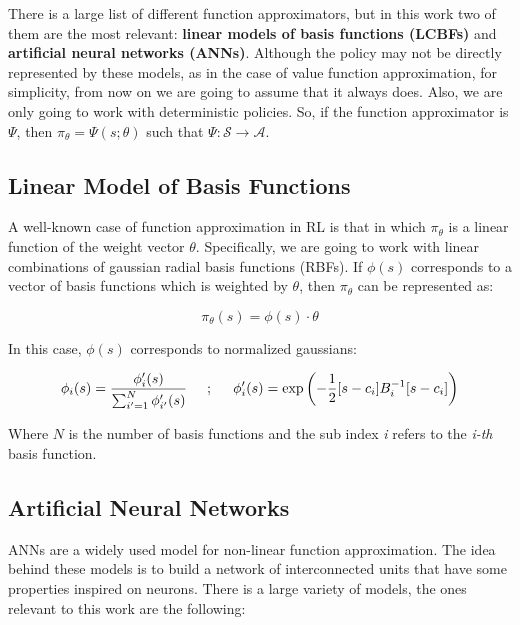 There is a large list of different function approximators, but in this work two of them are the most relevant: \textbf{linear models of basis functions (LCBFs)} and \textbf{artificial neural networks (ANNs)}. Although the policy may not be directly represented by these models, as in the case of value function approximation, for simplicity, from now on we are going to assume that it always does. Also, we are only going to work with deterministic policies. So, if the function approximator is $\Psi$, then $\pi_{\theta} = \Psi(s;\theta)$ such that $\Psi: \mathcal{S} \to \mathcal{A}$.

\newpage

\subsection{Linear Model of Basis Functions \cite{busoniu2010reinforcement}}
A well-known case of function approximation in RL is that in which $\pi_{\theta}$ is a linear function of
the weight vector $\theta$. Specifically, we are going to work with linear combinations of gaussian radial basis functions (RBFs). If $\phi(s)$ corresponds to a vector of basis functions which is weighted by $\theta$, then $\pi_{\theta}$ can be represented as:

\begin{equation}
    \pi_{\theta}(s) = \phi(s) \cdot \theta
    \label{eq:lcbf}
\end{equation}

In this case, $\phi(s)$ corresponds to normalized gaussians:

\begin{equation}
    \phi_{i}(s) = \frac{\phi'_{i}(s)}{\sum_{i'=1}^{N}{\phi'_{i'}(s)}}
    \hspace{0.5cm};
    \hspace{0.5cm}
    \phi'_{i}(s) = \exp\left( -\frac{1}{2}[s - c_{i}]B^{-1}_{i}[s-c_{i}]\right)
\end{equation}

\noindent Where $N$ is the number of basis functions and the sub index \emph{i} refers to the \emph{i-th} basis function.

\subsection{Artificial Neural Networks \cite{goodfellow2016deep, nielsen2015neural}}

ANNs are a widely used model for non-linear function approximation. The idea behind these models is to build a network of interconnected units that have some properties inspired on neurons. There is a large variety of models, the ones relevant to this work are the following:

